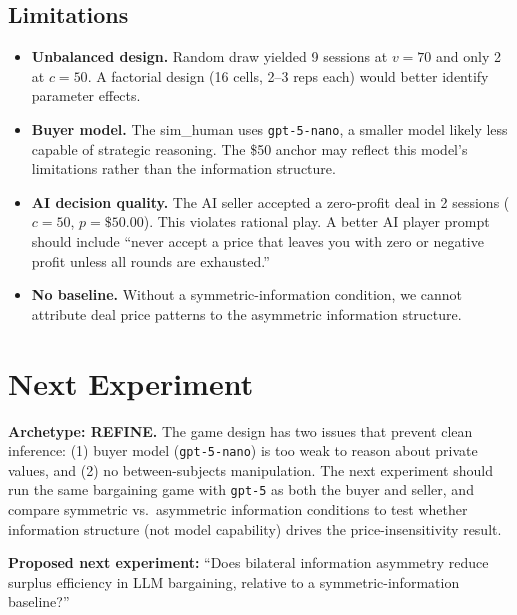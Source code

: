 \documentclass[11pt]{article}
\begin{document}
\subsection*{Limitations}

\begin{itemize}
    \item \textbf{Unbalanced design.} Random draw yielded 9 sessions at $v = 70$ and only 2 at $c = 50$. A factorial design (16 cells, 2--3 reps each) would better identify parameter effects.
    \item \textbf{Buyer model.} The sim\_human uses \texttt{gpt-5-nano}, a smaller model likely less capable of strategic reasoning. The \$50 anchor may reflect this model's limitations rather than the information structure.
    \item \textbf{AI decision quality.} The AI seller accepted a zero-profit deal in 2 sessions ($c = 50$, $p = \$50.00$). This violates rational play. A better AI player prompt should include ``never accept a price that leaves you with zero or negative profit unless all rounds are exhausted.''
    \item \textbf{No baseline.} Without a symmetric-information condition, we cannot attribute deal price patterns to the asymmetric information structure.
\end{itemize}

\section*{Next Experiment}

\textbf{Archetype: REFINE.} The game design has two issues that prevent clean inference: (1) buyer model (\texttt{gpt-5-nano}) is too weak to reason about private values, and (2) no between-subjects manipulation. The next experiment should run the same bargaining game with \texttt{gpt-5} as both the buyer and seller, and compare symmetric vs.\ asymmetric information conditions to test whether information structure (not model capability) drives the price-insensitivity result.

\textbf{Proposed next experiment:} ``Does bilateral information asymmetry reduce surplus efficiency in LLM bargaining, relative to a symmetric-information baseline?''
\end{document}
